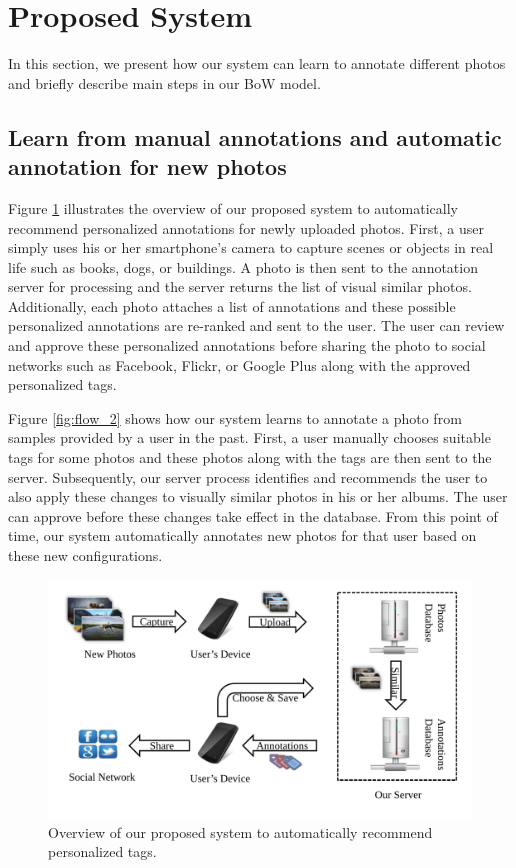 ﻿\section{Proposed System} \label{section:proposed_system}

In this section, we present how our system can learn to annotate different photos and briefly describe main steps in our BoW model.

\subsection {Learn from manual annotations and automatic annotation for new photos} \label{section:main_flow}

Figure \ref{fig:flow_1} illustrates the overview of our proposed system to automatically recommend personalized annotations for newly uploaded photos. First, a user simply uses his or her smartphone’s camera to capture scenes or objects in real life such as books, dogs, or buildings. A photo is then sent to the annotation server for processing and the server returns the list of visual similar photos. Additionally, each photo attaches a list of annotations and these possible personalized annotations are re-ranked and sent to the user. The user can review and approve these personalized annotations before sharing the photo to social networks such as Facebook, Flickr, or Google Plus along with the approved personalized tags.

Figure \ref{fig:flow_2} shows how our system learns to annotate a photo from samples provided by a user in the past. First, a user manually chooses suitable tags for some photos and these photos along with the tags are then sent to the server. Subsequently, our server process identifies and recommends the user to also apply these changes to visually similar photos in his or her albums. The user can approve before these changes take effect in the database. From this point of time, our system automatically annotates new photos for that user based on these new configurations.

\begin{figure}
    \centering
    \includegraphics[width=5.0in]{flow1.pdf}
    \caption{Overview of our proposed system to automatically recommend personalized tags.}
    \label{fig:flow_1}
\end{figure}

